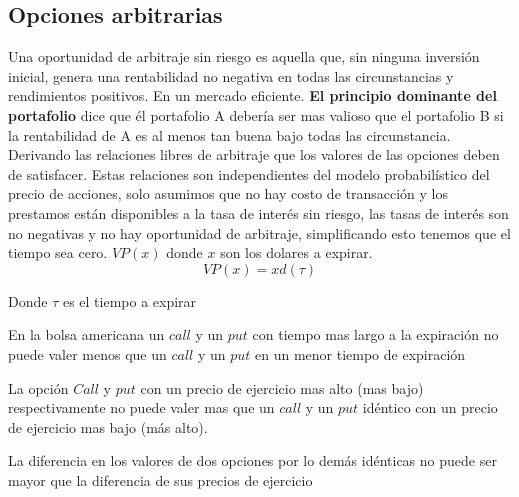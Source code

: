 \begin{defn}
				\section{Opciones arbitrarias}		
						Una oportunidad de arbitraje sin riesgo es aquella que, sin ninguna inversión inicial, genera una rentabilidad no negativa en todas las circunstancias y rendimientos positivos. En un mercado eficiente.
						\textbf{El principio dominante del portafolio} dice que él portafolio A debería ser mas valioso que el portafolio B si la rentabilidad de A es al menos tan buena bajo todas las circunstancia.\newline
						Derivando las relaciones libres de arbitraje que los valores de las opciones deben de satisfacer. Estas relaciones son independientes del modelo probabilístico del precio de acciones, solo asumimos que no hay costo de transacción y los prestamos están disponibles a la tasa de interés sin riesgo, las tasas de interés son no negativas y no hay oportunidad de arbitraje, simplificando esto tenemos que el tiempo sea cero. $ VP(x) $ donde $ x $ son los dolares a expirar. 
							\begin{equation}\label{eq0}
							VP(x)= xd(\tau) 
							\end{equation}
							
							Donde $ \tau $ es el tiempo a expirar
							\begin{lem}\label{lmcp11}
								En la bolsa americana un $ call $ y un $ put  $ con tiempo mas largo a la expiración no puede valer menos que un $ call $ y un $ put $ en un menor tiempo de expiración 
							\end{lem}
							
							\begin{lem}\label{lmcp11}
							La opción $ Call $ y $ put $ con un precio de ejercicio mas alto (mas bajo) respectivamente no puede valer mas que un $ call $ y un $ put $ idéntico con un precio de ejercicio mas bajo  (más alto).
							\end{lem}
							
							\begin{lem}\label{lmcp11}
							La diferencia en los valores de dos opciones por lo demás idénticas no puede ser mayor que la diferencia de sus precios de ejercicio
							\end{lem}
							

\end{defn}

